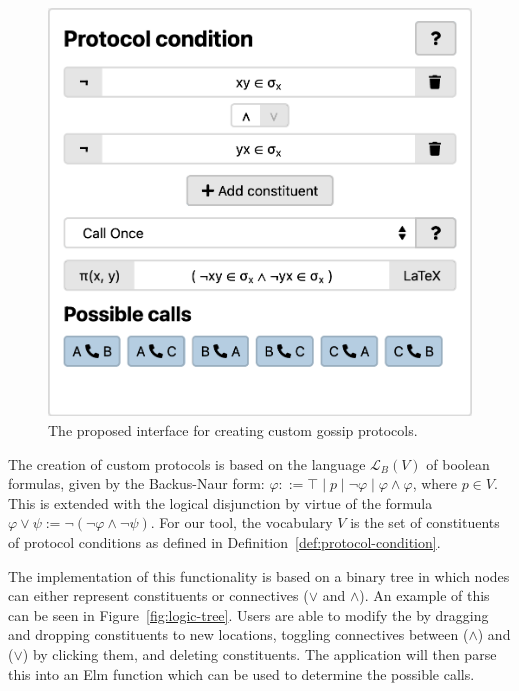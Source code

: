 \begin{figure}[htb!]
    \centering
    \includegraphics[width=\linewidth]{img/protocol-builder.png}
    \caption{The proposed interface for creating custom gossip protocols.}
    \label{fig:protocol-creator}
\end{figure}

The creation of custom protocols is based on the language \(\mathcal{L}_B(V)\) of boolean formulas, 
given by the Backus-Naur form:
\(\varphi ::= \top \mid p \mid \neg \varphi \mid \varphi \land \varphi\), where \(p \in V\). 
This is extended with the logical disjunction by virtue of the formula \(\varphi \lor \psi := \neg(\neg\varphi \land \neg\psi)\).
For our tool, the vocabulary \(V\) is the set of constituents of protocol conditions as defined in Definition~\ref{def:protocol-condition}.

The implementation of this functionality is based on a binary tree in which nodes can either represent constituents or connectives (\(\lor\) and \(\land\)). 
An example of this can be seen in Figure~\ref{fig:logic-tree}.
Users are able to modify the by dragging and dropping constituents to new locations,
toggling connectives between (\(\land\)) and (\(\lor\)) by clicking them,
and deleting constituents.
The application will then parse this into an Elm function which can be used to determine the possible calls.

